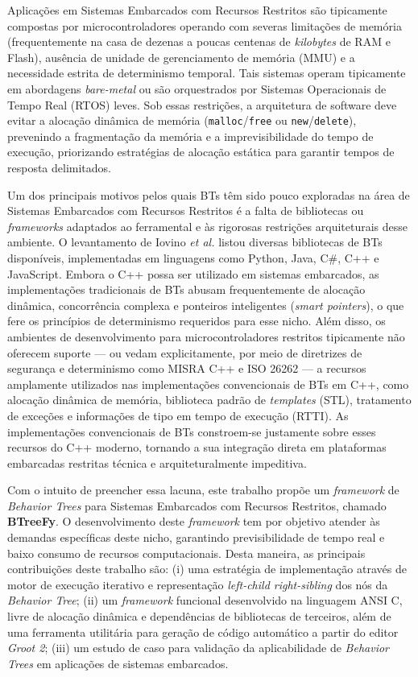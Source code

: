 \documentclass[conference]{IEEEtran}
\begin{document}
Aplicações em Sistemas Embarcados com Recursos Restritos são tipicamente compostas por microcontroladores operando com severas limitações de memória (frequentemente na casa de dezenas a poucas centenas de \textit{kilobytes} de RAM e Flash), ausência de unidade de gerenciamento de memória (MMU) e a necessidade estrita de determinismo temporal.
Tais sistemas operam tipicamente em abordagens \textit{bare-metal} ou são orquestrados por Sistemas Operacionais de Tempo Real (RTOS) leves. Sob essas restrições, a arquitetura de software deve evitar a alocação dinâmica de memória (\texttt{malloc}/\texttt{free} ou \texttt{new}/\texttt{delete}), prevenindo a fragmentação da memória e a imprevisibilidade do tempo de execução, priorizando estratégias de alocação estática para garantir tempos de resposta delimitados.

Um dos principais motivos pelos quais BTs têm sido pouco exploradas na área de Sistemas Embarcados com Recursos Restritos é a falta de bibliotecas ou \textit{frameworks} adaptados ao ferramental e às rigorosas restrições arquiteturais desse ambiente. O levantamento de Iovino \textit{et al.} \cite{iovino_survey_2022} listou diversas bibliotecas de BTs disponíveis, implementadas em linguagens como Python, Java, C\#, C++ e JavaScript. Embora o C++ possa ser utilizado em sistemas embarcados, as implementações tradicionais de BTs abusam frequentemente de alocação dinâmica, concorrência complexa e ponteiros inteligentes (\textit{smart pointers}), o que fere os princípios de determinismo requeridos para esse nicho. Além disso, os ambientes de desenvolvimento para microcontroladores restritos tipicamente não oferecem suporte — ou vedam explicitamente, por meio de diretrizes de segurança e determinismo como MISRA C++ e ISO 26262 — a recursos amplamente utilizados nas implementações convencionais de BTs em C++, como alocação dinâmica de memória, biblioteca padrão de \textit{templates} (STL), tratamento de exceções e informações de tipo em tempo de execução (RTTI). As implementações convencionais de BTs constroem-se justamente sobre esses recursos do C++ moderno, tornando a sua integração direta em plataformas embarcadas restritas técnica e arquiteturalmente impeditiva.

Com o intuito de preencher essa lacuna, este trabalho propõe um \textit{framework} de \textit{Behavior Trees} para Sistemas Embarcados com Recursos Restritos, chamado \textbf{BTreeFy}. O desenvolvimento deste \textit{framework} tem por objetivo atender às demandas específicas deste nicho, garantindo previsibilidade de tempo real e baixo consumo de recursos computacionais. Desta maneira, as principais contribuições deste trabalho são: (i) uma estratégia de implementação através de motor de execução iterativo e representação \textit{left-child right-sibling} dos nós da \textit{Behavior Tree}; (ii) um \textit{framework} funcional desenvolvido na linguagem ANSI C, livre de alocação dinâmica e dependências de bibliotecas de terceiros, além de uma ferramenta utilitária para geração de código automático a partir do editor \textit{Groot 2}; (iii) um estudo de caso para validação da aplicabilidade de \textit{Behavior Trees} em aplicações de sistemas embarcados.
\end{document}
